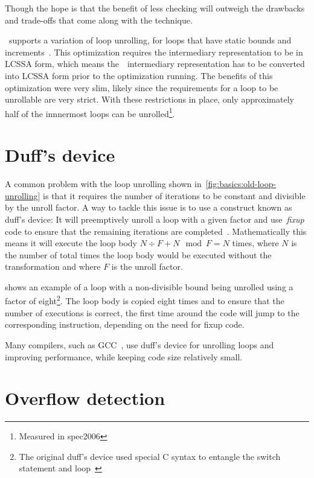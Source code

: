 Though the hope is that the benefit of less checking will outweigh the drawbacks and trade-offs that come along with the technique.

\libFIRM~supports a variation of loop unrolling, for loops that have static bounds and increments~\cite{aebi18bachelorarbeit}.
This optimization requires the intermediary representation to be in LCSSA form, which means the~\libFIRM~intermediary representation has to be converted into LCSSA form prior to the optimization running\cite{aebi18bachelorarbeit}.
The benefits of this optimization were very slim, likely since the requirements for a loop to be unrollable are very strict.
With these restrictions in place, only approximately half of the innnermost loops can be unrolled\footnote{Measured in spec2006}.




\section{Duff's device}\label{sec:basics:duffs}

A common problem with the loop unrolling shown in~\cref{fig:basics:old-loop-unrolling} is that it requires the number of iterations to be constant and divisible by the unroll factor.
A way to tackle this issue is to use a construct known as duff's device: It will preemptively unroll a loop with a given factor and use~\textit{fixup} code to ensure that the remaining iterations are completed~\cite{duff_1983}.
Mathematically this means it will execute the loop body $N \div F + N \mod F = N$ times, where $N$ is the number of total times the loop body would be executed without the transformation and where $F$ is the unroll factor.

 shows an example of a loop with a non-divisible bound being unrolled using a factor of eight\footnote{The original duff's device used special C syntax to entangle the switch statement and loop~\cite{duff_1983}}.
The loop body is copied eight times and to ensure that the number of executions is correct, the first time around the code will jump to the corresponding instruction, depending on the need for fixup code.

Many compilers, such as GCC~\cite{gcc}, use duff's device for unrolling loops and improving performance, while keeping code size relatively small.



\section{Overflow detection}\label{sec:basics:overflow}

